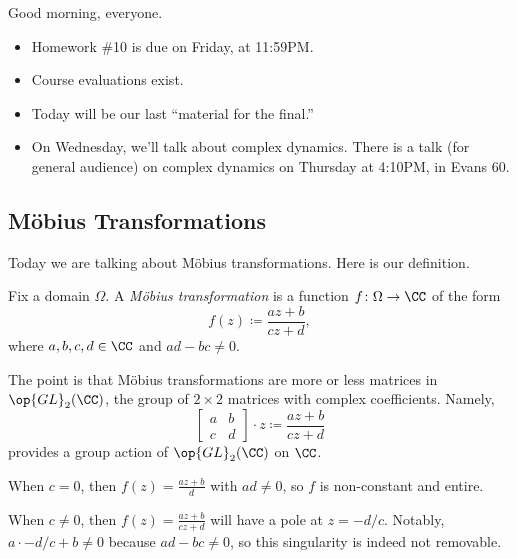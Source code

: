 
Good morning, everyone.
\begin{itemize}
	\item Homework \#10 is due on Friday, at 11:59PM.
	\item Course evaluations exist.
	\item Today will be our last ``material for the final.''
	\item On Wednesday, we'll talk about complex dynamics. There is a talk (for general audience) on complex dynamics on Thursday at 4:10PM, in Evans 60.
\end{itemize}

\subsection{M\"obius Transformations}
Today we are talking about M\"obius transformations. Here is our definition.
\begin{definition}
	Fix a domain $\Omega$. A \textit{M\"obius transformation} is a function $f\colon\Omega\to\CC$ of the form
	\[f(z)\coloneqq\frac{az+b}{cz+d},\]
	where $a,b,c,d\in\CC$ and $ad-bc\ne0$.
\end{definition}
The point is that M\"obius transformations are more or less matrices in $\op{GL}_2(\CC)$, the group of $2\times2$ matrices with complex coefficients. Namely,
\[\begin{bmatrix}
	a & b \\
	c & d
\end{bmatrix}\cdot z\coloneqq\frac{az+b}{cz+d}\]
provides a group action of $\op{GL}_2(\CC)$ on $\CC$.
\begin{example}
	When $c=0$, then $f(z)=\frac{az+b}{d}$ with $ad\ne0$, so $f$ is non-constant and entire.
\end{example}
\begin{example}
	When $c\ne0$, then $f(z)=\frac{az+b}{cz+d}$ will have a pole at $z=-d/c$. Notably, $a\cdot-d/c+b\ne0$ because $ad-bc\ne0$, so this singularity is indeed not removable.
\end{example}

